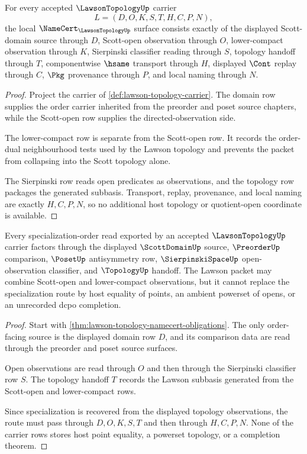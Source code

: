 \begin{theorem}
\label{thm:lawson-topology-namecert-obligations}
For every accepted $\LawsonTopologyUp$ carrier
$$
L=(D,O,K,S,T,H,C,P,N),
$$
the local $\NameCert_{\LawsonTopologyUp}$ surface consists exactly of the displayed Scott-domain source through $D$, Scott-open observation through $O$, lower-compact observation through $K$, Sierpinski classifier reading through $S$, topology handoff through $T$, componentwise $\hsame$ transport through $H$, displayed $\Cont$ replay through $C$, $\Pkg$ provenance through $P$, and local naming through $N$.
\end{theorem}
\begin{proof}
Project the carrier of \autoref{def:lawson-topology-carrier}. The domain row supplies the order carrier inherited from the preorder and poset source chapters, while the Scott-open row supplies the directed-observation side.

The lower-compact row is separate from the Scott-open row. It records the order-dual neighbourhood tests used by the Lawson topology and prevents the packet from collapsing into the Scott topology alone.

The Sierpinski row reads open predicates as observations, and the topology row packages the generated subbasis. Transport, replay, provenance, and local naming are exactly $H,C,P,N$, so no additional host topology or quotient-open coordinate is available.
\end{proof}

\begin{theorem}
\label{thm:lawson-topology-scott-specialization-handoff}
Every specialization-order read exported by an accepted $\LawsonTopologyUp$ carrier factors through the displayed $\ScottDomainUp$ source, $\PreorderUp$ comparison, $\PosetUp$ antisymmetry row, $\SierpinskiSpaceUp$ open-observation classifier, and $\TopologyUp$ handoff. The Lawson packet may combine Scott-open and lower-compact observations, but it cannot replace the specialization route by host equality of points, an ambient powerset of opens, or an unrecorded dcpo completion.
\end{theorem}
\begin{proof}
Start with \autoref{thm:lawson-topology-namecert-obligations}. The only order-facing source is the displayed domain row $D$, and its comparison data are read through the preorder and poset source surfaces.

Open observations are read through $O$ and then through the Sierpinski classifier row $S$. The topology handoff $T$ records the Lawson subbasis generated from the Scott-open and lower-compact rows.

Since specialization is recovered from the displayed topology observations, the route must pass through $D,O,K,S,T$ and then through $H,C,P,N$. None of the carrier rows stores host point equality, a powerset topology, or a completion theorem.
\end{proof}

